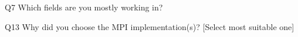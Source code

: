 \begin{description}%
\item{Q7} Which fields are you mostly working in?%
\item{Q13} Why did you choose the MPI implementation(s)? [Select most suitable one]%
\end{description}%
